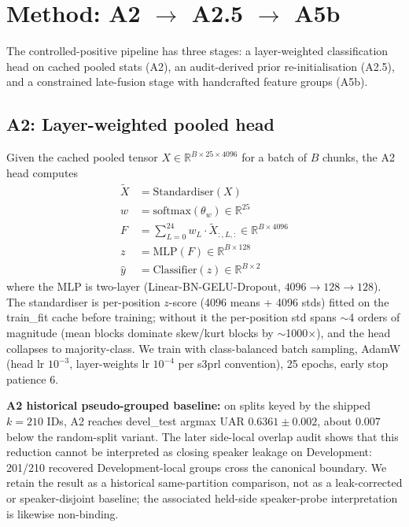 \section{Method: A2 $\rightarrow$ A2.5 $\rightarrow$ A5b}
\label{sec:method}

The controlled-positive pipeline has three stages: a layer-weighted classification head on cached pooled stats (A2), an audit-derived prior re-initialisation (A2.5), and a constrained late-fusion stage with handcrafted feature groups (A5b).

\subsection{A2: Layer-weighted pooled head}
\label{ssec:a2}

Given the cached pooled tensor $X \in \mathbb{R}^{B \times 25 \times 4096}$ for a batch of $B$ chunks, the A2 head computes
\begin{align}
\tilde{X} &= \mathrm{Standardiser}(X) \\
w &= \mathrm{softmax}(\theta_w) \in \mathbb{R}^{25} \\
F &= \sum_{L=0}^{24} w_L \cdot \tilde{X}_{:, L, :} \in \mathbb{R}^{B \times 4096} \\
z &= \mathrm{MLP}(F) \in \mathbb{R}^{B \times 128} \\
\hat{y} &= \mathrm{Classifier}(z) \in \mathbb{R}^{B \times 2}
\end{align}
where the MLP is two-layer (Linear-BN-GELU-Dropout, $4096{\to}128{\to}128$). The standardiser is per-position $z$-score (4096 means + 4096 stds) fitted on the train\_fit cache before training; without it the per-position std spans $\sim$4 orders of magnitude (mean blocks dominate skew/kurt blocks by $\sim$1000$\times$), and the head collapses to majority-class. We train with class-balanced batch sampling, AdamW (head lr $10^{-3}$, layer-weights lr $10^{-4}$ per s3prl convention), 25 epochs, early stop patience 6.

\textbf{A2 historical pseudo-grouped baseline:} on splits keyed by the shipped $k{=}210$ IDs, A2 reaches devel\_test argmax UAR $0.6361 \pm 0.002$, about $0.007$ below the random-split variant. The later side-local overlap audit shows that this reduction cannot be interpreted as closing speaker leakage on Development: 201/210 recovered Development-local groups cross the canonical boundary. We retain the result as a historical same-partition comparison, not as a leak-corrected or speaker-disjoint baseline; the associated held-side speaker-probe interpretation is likewise non-binding.

